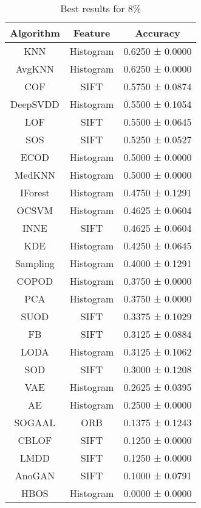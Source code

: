 \documentclass{article}
\begin{document}
\begin{table}[]
\centering\begin{tabular}{c|c|c}
\toprule
Algorithm & Feature & Accuracy \\
\midrule
KNN & Histogram & 0.6250 ± 0.0000 \\
AvgKNN & Histogram & 0.6250 ± 0.0000 \\
COF & SIFT & 0.5750 ± 0.0874 \\
DeepSVDD & Histogram & 0.5500 ± 0.1054 \\
LOF & SIFT & 0.5500 ± 0.0645 \\
SOS & SIFT & 0.5250 ± 0.0527 \\
ECOD & Histogram & 0.5000 ± 0.0000 \\
MedKNN & Histogram & 0.5000 ± 0.0000 \\
IForest & Histogram & 0.4750 ± 0.1291 \\
OCSVM & Histogram & 0.4625 ± 0.0604 \\
INNE & SIFT & 0.4625 ± 0.0604 \\
KDE & Histogram & 0.4250 ± 0.0645 \\
Sampling & Histogram & 0.4000 ± 0.1291 \\
COPOD & Histogram & 0.3750 ± 0.0000 \\
PCA & Histogram & 0.3750 ± 0.0000 \\
SUOD & SIFT & 0.3375 ± 0.1029 \\
FB & SIFT & 0.3125 ± 0.0884 \\
LODA & Histogram & 0.3125 ± 0.1062 \\
SOD & SIFT & 0.3000 ± 0.1208 \\
VAE & Histogram & 0.2625 ± 0.0395 \\
AE & Histogram & 0.2500 ± 0.0000 \\
SOGAAL & ORB & 0.1375 ± 0.1243 \\
CBLOF & SIFT & 0.1250 ± 0.0000 \\
LMDD & SIFT & 0.1250 ± 0.0000 \\
AnoGAN & SIFT & 0.1000 ± 0.0791 \\
HBOS & Histogram & 0.0000 ± 0.0000 \\
\bottomrule
\end{tabular}
\caption{Best results for 8\%}
\label{tab:my_label}
\end{table}
\end{document}
